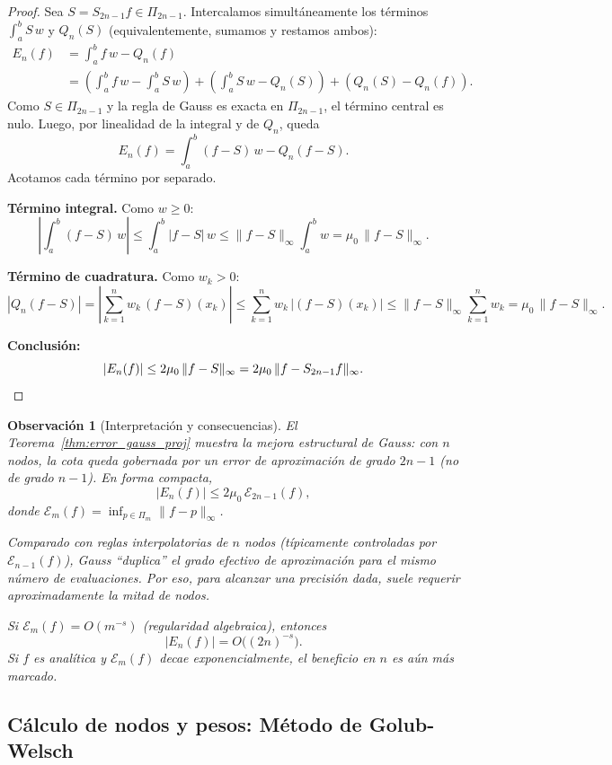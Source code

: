 \documentclass[a4paper,11pt]{report}
\newtheorem{remark}[theorem]{Observación}
\begin{document}
\begin{proof}
Sea $S = S_{2n-1}f \in \Pi_{2n-1}$. Intercalamos simultáneamente los términos $\int_a^b S\,w$ y $Q_n(S)$ (equivalentemente, sumamos y restamos ambos):
\[
\begin{aligned}
E_n(f)
&= \int_a^b f\,w - Q_n(f) \\
&= \left(\int_a^b f\,w - \int_a^b S\,w\right)
 + \left(\int_a^b S\,w - Q_n(S)\right)
 + \left(Q_n(S)-Q_n(f)\right).
\end{aligned}
\]
Como $S\in\Pi_{2n-1}$ y la regla de Gauss es exacta en $\Pi_{2n-1}$, el término central es nulo. Luego, por linealidad de la integral y de $Q_n$, queda
\[
E_n(f)=\int_a^b (f-S)\,w - Q_n(f-S).
\]
Acotamos cada término por separado.

\textbf{Término integral.}\; Como $w\ge 0$:
\[
\left|\int_a^b (f-S)\,w\right| \leq \int_a^b |f-S|\,w \leq \|f-S\|_{\infty}\int_a^b w = \mu_0\,\|f-S\|_{\infty}.
\]

\textbf{Término de cuadratura.}\; Como $w_k>0$:
\[
\left|Q_n(f-S)\right| = \left|\sum_{k=1}^n w_k\,(f-S)(x_k)\right|
\leq \sum_{k=1}^n w_k\,|(f-S)(x_k)|
\leq \|f-S\|_{\infty}\sum_{k=1}^n w_k
= \mu_0\,\|f-S\|_{\infty}.
\]

\textbf{Conclusión:}
\[
|E_n(f)| \leq 2\mu_0\,\|f-S\|_{\infty} = 2\mu_0\,\|f - S_{2n-1}f\|_{\infty}. \qedhere
\]
\end{proof}

\begin{remark}[Interpretación y consecuencias]
El Teorema~\ref{thm:error_gauss_proj} muestra la mejora estructural de Gauss: con $n$ nodos, la cota queda gobernada por un error de aproximación de grado $2n-1$ (no de grado $n-1$).  En forma compacta,
\[
|E_n(f)| \le 2\mu_0\,\mathcal E_{2n-1}(f),
\]
donde $\mathcal E_m(f)=\inf_{p\in\Pi_m}\|f-p\|_\infty$.

Comparado con reglas interpolatorias de $n$ nodos (típicamente controladas por $\mathcal E_{n-1}(f)$), Gauss ``duplica'' el grado efectivo de aproximación para el mismo número de evaluaciones.  Por eso, para alcanzar una precisión dada, suele requerir aproximadamente la mitad de nodos.

Si $\mathcal E_m(f)=O(m^{-s})$ (regularidad algebraica), entonces
\[
|E_n(f)| = O\big((2n)^{-s}\big).
\]
Si $f$ es analítica y $\mathcal E_m(f)$ decae exponencialmente, el beneficio en $n$ es aún más marcado.
\end{remark}

\subsection{Cálculo de nodos y pesos: Método de Golub-Welsch}
\end{document}
